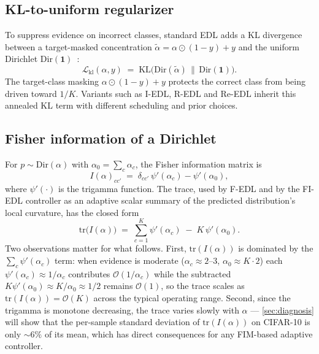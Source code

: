 \documentclass[review,5p,times]{elsarticle}
\begin{document}
\subsection{KL-to-uniform regularizer}
To suppress evidence on incorrect classes, standard EDL adds a KL divergence
between a target-masked concentration
$\tilde\alpha = \alpha\odot(1-y)+y$ and the uniform Dirichlet
$\mathrm{Dir}(\mathbf{1})$~\citep{sensoy2018edl}:
\begin{equation}
  \mathcal{L}_{\text{kl}}(\alpha,y) \;=\;
  \mathrm{KL}\!\bigl(\mathrm{Dir}(\tilde\alpha)\,\|\,\mathrm{Dir}(\mathbf{1})\bigr).
  \label{eq:kl}
\end{equation}
The target-class masking $\alpha\odot(1-y)+y$ protects the correct class from
being driven toward $1/K$. Variants such as I-EDL, R-EDL and Re-EDL inherit
this annealed KL term with different scheduling and prior choices.

\subsection{Fisher information of a Dirichlet}
\label{sec:fim}
For $p\sim\mathrm{Dir}(\alpha)$ with $\alpha_0=\sum_c\alpha_c$, the Fisher
information matrix is
\begin{equation}
  I(\alpha)_{cc'} \;=\; \delta_{cc'}\,\psi'(\alpha_c) - \psi'(\alpha_0),
  \label{eq:fim}
\end{equation}
where $\psi'(\cdot)$ is the trigamma function. The trace, used by F-EDL and
by the FI-EDL controller as an adaptive scalar summary of the predicted
distribution's local curvature, has the closed form
\begin{equation}
  \mathrm{tr}\bigl(I(\alpha)\bigr) \;=\;
  \sum_{c=1}^{K}\psi'(\alpha_c) \;-\; K\,\psi'(\alpha_0).
  \label{eq:fimtrace}
\end{equation}
Two observations matter for what follows. First, $\mathrm{tr}(I(\alpha))$ is
dominated by the $\sum_c\psi'(\alpha_c)$ term: when evidence is moderate
($\alpha_c\!\approx\!2\text{--}3$, $\alpha_0\!\approx\!K\!\cdot\!2$) each
$\psi'(\alpha_c)\!\approx\!1/\alpha_c$ contributes $\mathcal{O}(1/\alpha_c)$
while the subtracted $K\psi'(\alpha_0)\!\approx\!K/\alpha_0\!\approx\!1/2$
remains $\mathcal{O}(1)$, so the trace scales as
$\mathrm{tr}(I(\alpha))\!=\!\mathcal{O}(K)$ across the typical operating
range. Second, since the trigamma is monotone decreasing, the trace varies
slowly with $\alpha$ — \autoref{sec:diagnosis} will show that the per-sample
standard deviation of $\mathrm{tr}(I(\alpha))$ on CIFAR-10 is only $\sim 6\%$
of its mean, which has direct consequences for any FIM-based adaptive
controller.
\end{document}
